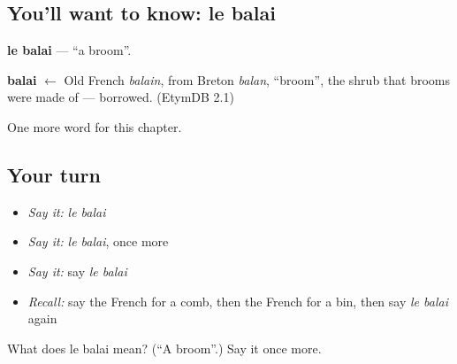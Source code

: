 \subsection*{You'll want to know: le balai}
\textbf{le balai} — \textquotedblleft{}a broom\textquotedblright{}.

\begin{cousinweb}
\textbf{balai} $\leftarrow$ Old French \emph{balain}, from Breton \emph{balan}, \textquotedblleft{}broom\textquotedblright{}, the shrub that brooms were made of — borrowed. (EtymDB 2.1)
\end{cousinweb}

\begin{grammarlens}[title={What you've built}]
One more word for this chapter.
\end{grammarlens}

\subsection*{Your turn}
\begin{itemize}
\raggedright
  \item \emph{Say it:} \emph{le balai}
  \item \emph{Say it:} \emph{le balai}, once more
  \item \emph{Say it:} say \emph{le balai}
  \item \emph{Recall:} say the French for a comb, then the French for a bin, then say \emph{le balai} again
\end{itemize}

\begin{tcolorbox}[breakable,colback=teal!4,colframe=teal!35!black,title={Before you move on}]
What does le balai mean? (\textquotedblleft{}A broom\textquotedblright{}.) Say it once more.
\end{tcolorbox}
